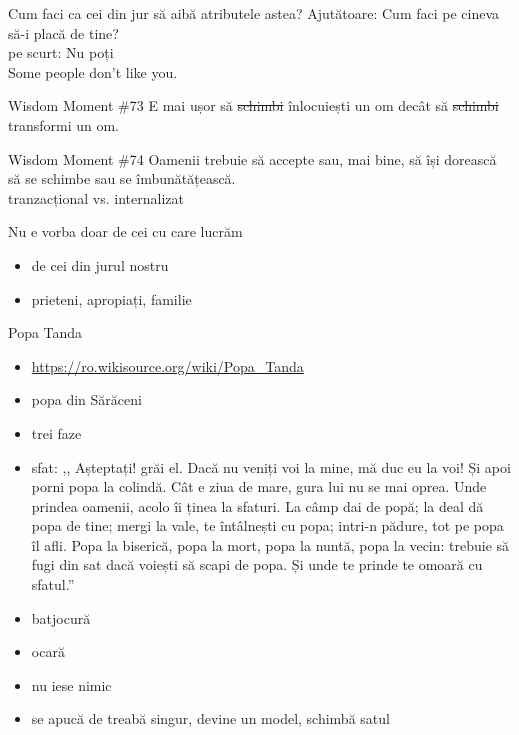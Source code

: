 \documentclass{beamer}
\begin{document}
\begin{frame}{Cum faci ca cei din jur să aibă atributele astea?}
  \centering
  \pause \Large{Ajutătoare: Cum faci pe cineva să-i placă de tine?}\\
  \vspace{0.5cm}
  \pause \Large{pe scurt: Nu poți}\\
  \vspace{0.5cm}
  \pause \Large{Some people don't like you.}\\
\end{frame}

\begin{frame}{Wisdom Moment \#73}
  \centering
  \pause \Large{E mai ușor să \sout{schimbi} înlocuiești un om decât să \sout{schimbi} transformi un om.}
\end{frame}

\begin{frame}{Wisdom Moment \#74}
  \centering
  \pause \Large{Oamenii trebuie să accepte sau, mai bine, să își dorească să se schimbe sau se îmbunătățească.}\\
  \vspace{0.5cm}
  \pause tranzacțional vs. internalizat
\end{frame}

\begin{frame}{Nu e vorba doar de cei cu care lucrăm}
  \begin{itemize}
    \pause \item de cei din jurul nostru
    \pause \item prieteni, apropiați, familie
  \end{itemize}
\end{frame}

\begin{frame}{Popa Tanda}
  \begin{itemize}
    \pause \item \url{https://ro.wikisource.org/wiki/Popa\_Tanda}
    \pause \item popa din Sărăceni
    \pause \item trei faze
    \pause \item sfat: ,, Așteptați! grăi el. Dacă nu veniți voi la mine, mă duc eu la voi! Și apoi porni popa la colindă. Cât e ziua de mare, gura lui nu se mai oprea. Unde prindea oamenii, acolo îi ținea la sfaturi. La câmp dai de popă; la deal dă popa de tine; mergi la vale, te întâlnești cu popa; intri-n pădure, tot pe popa îl afli. Popa la biserică, popa la mort, popa la nuntă, popa la vecin: trebuie să fugi din sat dacă voiești să scapi de popa. Și unde te prinde te omoară cu sfatul.''
    \pause \item batjocură
    \pause \item ocară
    \pause \item nu iese nimic
    \pause \item se apucă de treabă singur, devine un model, schimbă satul
  \end{itemize}
\end{frame}
\end{document}
